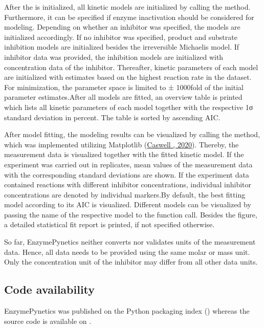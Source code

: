 \documentclass[letterpaper,12pt,english]{jupyterBook}
\begin{document}
After the  is initialized, all kinetic models are initialized by calling the  method. Furthermore, it can be specified if enzyme inactivation should be considered for modeling. Depending on whether an inhibitor was specified, the models are initialized accordingly. If no inhibitor was specified, product and substrate inhibition models are initialized besides the irreversible Michaelis model. If inhibitor data was provided, the inhibition models are initialized with concentration data of the inhibitor. Thereafter, kinetic parameters of each model are initialized with estimates based on the highest reaction rate in the dataset. For minimization, the parameter space is limited to ± 1000\sphinxhyphen{}fold of the initial parameter estimates.After all models are fitted, an overview table is printed which lists all kinetic parameters of each model together with the respective 1σ standard deviation in percent. The table is sorted by ascending AIC.

\sphinxAtStartPar
{}

After model fitting, the modeling results can be visualized by calling the  method, which was implemented utilizing Matplotlib (\hyperlink{cite.references:id36}{Caswell , 2020}).
Thereby, the measurement data is visualized together with the fitted kinetic model. If the experiment was carried out in replicates, mean values of the measurement data with the corresponding standard deviations are shown. If the experiment data contained reactions with different inhibitor concentrations, individual inhibitor concentrations are denoted by individual markers.By default, the best fitting model according to its AIC is visualized. Different models can be visualized by passing the name of the respective model to the function call. Besides the figure, a detailed statistical fit report is printed, if not specified otherwise.

\sphinxAtStartPar
{}

So far, EnzymePynetics neither converts nor validates units of the measurement data. Hence, all data needs to be provided using the same molar or mass unit. Only the concentration unit of the inhibitor may differ from all other data units.


\subsection{Code availability}
\label{\detokenize{methods:id6}}
\sphinxAtStartPar
EnzymePynetics was published on the Python packaging index () whereas the source code is available on .
\end{document}
